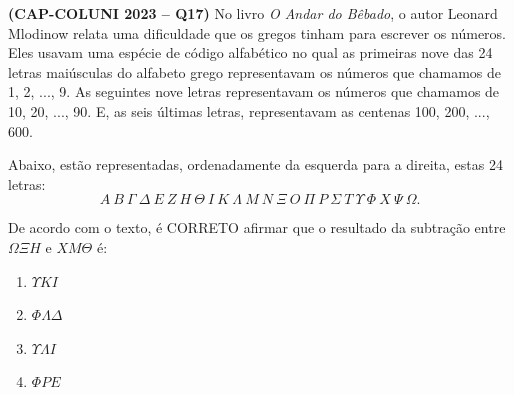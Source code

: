 \textbf{(CAP-COLUNI 2023 -- Q17)} No livro \textit{O Andar do Bêbado}, o autor Leonard Mlodinow relata uma dificuldade que os gregos tinham para escrever os números. Eles usavam uma espécie de código alfabético no qual as primeiras nove das 24 letras maiúsculas do alfabeto grego representavam os números que chamamos de 1, 2, ..., 9. As seguintes nove letras representavam os números que chamamos de 10, 20, ..., 90. E, as seis últimas letras, representavam as centenas 100, 200, ..., 600.

Abaixo, estão representadas, ordenadamente da esquerda para a direita, estas 24 letras:
\[
A\ B\ \Gamma\ \Delta\ E\ Z\ H\ \Theta\ I\ K\ \Lambda\ M\ N\ \Xi\ O\ \Pi\ P\ \Sigma\ T\ \Upsilon\ \Phi\ X\ \Psi\ \Omega.
\]

De acordo com o texto, é CORRETO afirmar que o resultado da subtração entre $\Omega\Xi H$ e $XM\Theta$ é:

\begin{enumerate}
	\item $\Upsilon K I$
	\item $\Phi\Lambda\Delta$
	\item $\Upsilon\Lambda I$
	\item $\Phi P E$
\end{enumerate}
